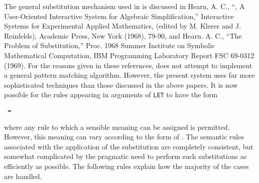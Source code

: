 The general substitution mechanism used in {\REDUCE} is discussed in Hearn, A.
C., ``{\REDUCE}, A User-Oriented Interactive System for Algebraic
Simplification,'' Interactive Systems for Experimental Applied Mathematics,
(edited by M. Klerer and J. Reinfelds), Academic Press, New York (1968),
79-90, and Hearn. A. C., ``The Problem of Substitution,'' Proc. 1968 Summer
Institute on Symbolic Mathematical Computation, IBM Programming Laboratory
Report FSC 69-0312 (1969). For the reasons given in these
references, {\REDUCE} does not attempt to implement a general pattern
matching algorithm.  However, the present system uses far more sophisticated
techniques than those discussed in the above papers.  It is now possible for
the rules appearing in arguments of \texttt{LET} to have the form
\begin{syntax}
        \texttt{ = } 
\end{syntax}
where any rule to which a sensible meaning can be assigned is permitted.
However, this meaning can vary according to the form of . The semantic rules associated with the application of the
substitution are completely consistent, but somewhat complicated by the
pragmatic need to perform such substitutions as efficiently as possible.
The following rules explain how the majority of the cases are handled.

